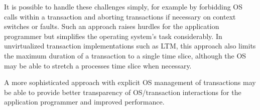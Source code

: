 It is possible to handle these challenges simply, for example by
forbidding OS calls within a transaction and aborting transactions if
necessary on context switches or faults.  Such an approach raises
hurdles for the application programmer but simplifies the operating
system's task considerably.  In unvirtualized transaction
implementations such as LTM, this approach also limits the maximum
duration of a transaction to a single time slice, although the OS may
be able to stretch a processes time slice when necessary.

A more sophisticated approach with explicit OS management of
transactions may be able to provide better transparency of
OS/transaction interactions for the application programmer and
improved performance.

